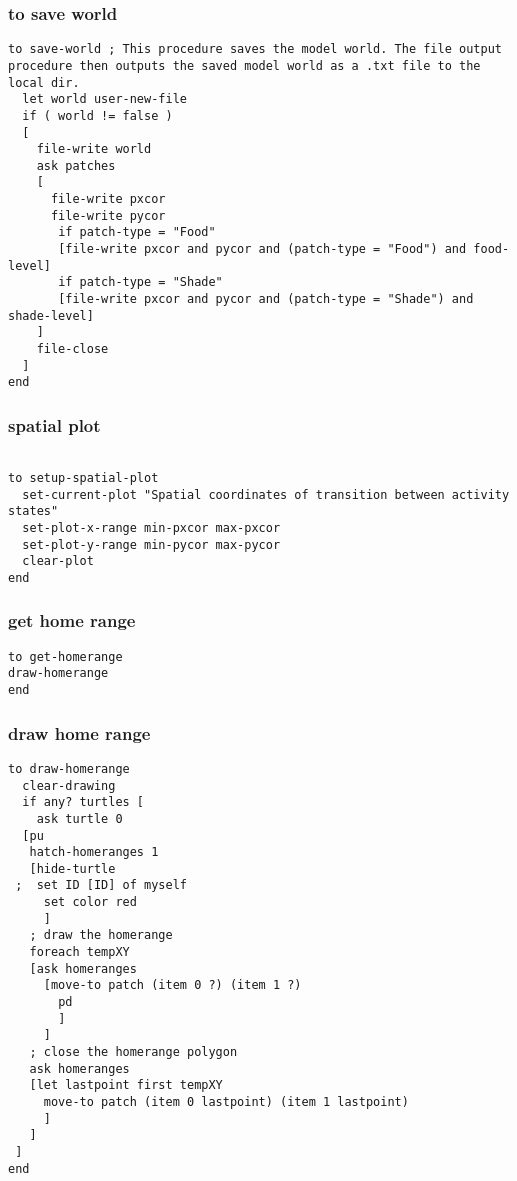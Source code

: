 \documentclass[]{article}
\begin{document}
\subsubsection{to save world}\label{to-save-world}

\begin{verbatim}
to save-world ; This procedure saves the model world. The file output procedure then outputs the saved model world as a .txt file to the local dir.
  let world user-new-file
  if ( world != false )
  [
    file-write world
    ask patches
    [
      file-write pxcor
      file-write pycor
       if patch-type = "Food"
       [file-write pxcor and pycor and (patch-type = "Food") and food-level]
       if patch-type = "Shade"
       [file-write pxcor and pycor and (patch-type = "Shade") and shade-level]
    ]
    file-close
  ]
end
\end{verbatim}

\subsubsection{spatial plot}\label{spatial-plot}

\begin{verbatim}

to setup-spatial-plot
  set-current-plot "Spatial coordinates of transition between activity states"
  set-plot-x-range min-pxcor max-pxcor
  set-plot-y-range min-pycor max-pycor
  clear-plot
end
\end{verbatim}

\subsubsection{get home range}\label{get-home-range}

\begin{verbatim}
to get-homerange
draw-homerange
end
\end{verbatim}

\subsubsection{draw home range}\label{draw-home-range}

\begin{verbatim}
to draw-homerange
  clear-drawing
  if any? turtles [
    ask turtle 0
  [pu
   hatch-homeranges 1
   [hide-turtle
 ;  set ID [ID] of myself
     set color red
     ]
   ; draw the homerange
   foreach tempXY
   [ask homeranges
     [move-to patch (item 0 ?) (item 1 ?)
       pd
       ]
     ]
   ; close the homerange polygon
   ask homeranges
   [let lastpoint first tempXY
     move-to patch (item 0 lastpoint) (item 1 lastpoint)
     ]
   ]
 ]
end
\end{verbatim}
\end{document}
